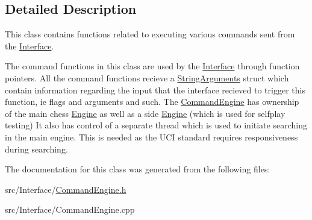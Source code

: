 \subsection{Detailed Description}
This class contains functions related to executing various commands sent from the \hyperlink{classInterface}{Interface}. 

The command functions in this class are used by the \hyperlink{classInterface}{Interface} through function pointers. All the command functions recieve a \hyperlink{structStringArguments}{String\+Arguments} struct which contain information regarding the input that the interface recieved to trigger this function, ie flags and arguments and such. The \hyperlink{classCommandEngine}{Command\+Engine} has ownership of the main chess \hyperlink{classEngine}{Engine} as well as a side \hyperlink{classEngine}{Engine} (which is used for selfplay testing) It also has control of a separate thread which is used to initiate searching in the main engine. This is needed as the U\+CI standard requires responsiveness during searching. 

The documentation for this class was generated from the following files\+:\begin{DoxyCompactItemize}
\item 
src/\+Interface/\hyperlink{CommandEngine_8h}{Command\+Engine.\+h}\item 
src/\+Interface/Command\+Engine.\+cpp\end{DoxyCompactItemize}
